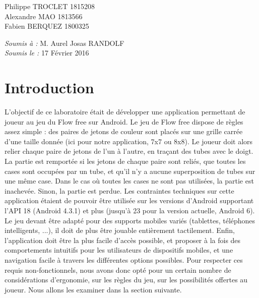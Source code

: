 \documentclass[12pt, a4paper]{article}%
\begin{document}
\begin{titlepage}
\begin{sffamily}
\begin{center}
    \begin{minipage}{0.4\textwidth}
      \begin{flushleft} \large
          Philippe TROCLET \textsc{1815208}\\
          Alexandre  MAO \textsc{1813566}\\
          Fabien  BERQUEZ \textsc{1800325}\\
      \end{flushleft}
    \end{minipage}
    \begin{minipage}{0.4\textwidth}
      \begin{flushright} \large
        \emph{Soumis à :} M. Aurel Josas RANDOLF\\
        \emph{Soumis le :} 17 Février 2016 
      \end{flushright}
    \end{minipage}

    \vfill

  \end{center}
  \end{sffamily}
\end{titlepage}%


\section{Introduction}
	L'objectif de ce laboratoire était de développer une application permettant de joueur au jeu du Flow free sur Android. Le jeu de Flow free dispose de règles assez simple : des paires de jetons de couleur sont placés sur une grille carrée d'une taille donnée (ici pour notre application, 7x7 ou 8x8). Le joueur doit alors relier chaque paire de jetons de l'un à l'autre, en traçant des tubes avec le doigt. La partie est remportée si les jetons de chaque paire sont reliés, que toutes les cases sont occupées par un tube, et qu'il n'y a aucune superposition de tubes sur une même case. Dans le cas où toutes les cases ne sont pas utilisées, la partie est inachevée. Sinon, la partie est perdue.
	\newline
	Les contraintes techniques sur cette application étaient de pouvoir être utilisée sur les versions d'Android supportant l'API 18 (Android 4.3.1) et plus (jusqu'à 23 pour la version actuelle, Android 6). Le jeu devant être adapté pour des supports mobiles variés (tablettes, téléphones intelligents, ...), il doit de plus être jouable entièrement tactilement. Enfin, l'application doit être la plus facile d'accès possible, et proposer à la fois des comportements intuitifs pour les utilisateurs de dispositifs mobiles, et une navigation facile à travers les différentes options possibles.
	\newline
	Pour respecter ces requis non-fonctionnels, nous avons donc opté pour un certain nombre de considérations d'ergonomie, sur les règles du jeu, sur les possibilités offertes au joueur. Nous allons les examiner dans la section suivante.
	
\end{document}
